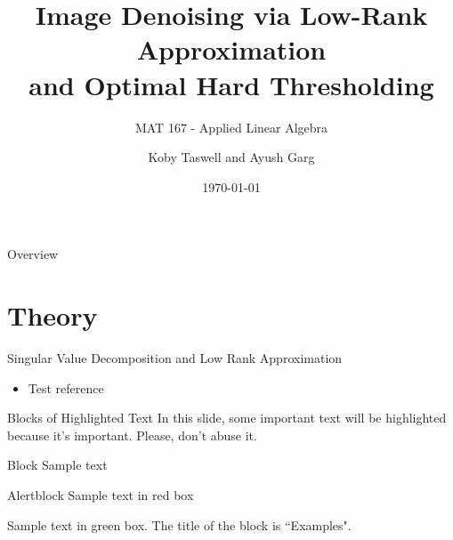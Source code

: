 \documentclass[aspectratio=169,xcolor=dvipsnames]{beamer}
\title[Denoising with SVD]{Image Denoising via Low-Rank Approximation\\ and Optimal Hard Thresholding}
\subtitle{MAT 167 - Applied Linear Algebra}
\author[Taswell and Garg] {Koby Taswell and Ayush Garg}
\institute[UCD] %
{
	University of California, Davis 
	\vskip 3pt
}
\date{\today} %
\begin{document}
	
	\begin{frame}
		\titlepage
	\end{frame}
	
	\begin{frame}{Overview}
		\tableofcontents
	\end{frame}
	
	\section{Theory}
	
	\begin{frame}{Singular Value Decomposition and Low Rank Approximation}
		\begin{itemize}
			test
			\item Test reference \cite{Golub1987}
		\end{itemize}
	\end{frame}
	
	
	\begin{frame}{Blocks of Highlighted Text}
		In this slide, some important text will be \alert{highlighted} because it's important. Please, don't abuse it.
		
		\begin{block}{Block}
			Sample text
		\end{block}
		
		\begin{alertblock}{Alertblock}
			Sample text in red box
		\end{alertblock}
		
		\begin{examples}
			Sample text in green box. The title of the block is ``Examples".
		\end{examples}
	\end{frame}
	
\end{document}
